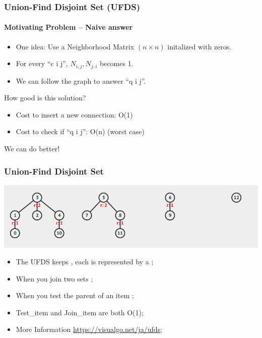 \begin{frame}
  \frametitle{Union-Find Disjoint Set (UFDS)}
  \framesubtitle{Motivating Problem -- Naive answer}

  \begin{itemize}
  \item One idea: Use a Neighborhood Matrix $(n\times n)$ initalized with zeros.
  \item For every ``c i j'', $N_{i,j}, N_{j,i}$ becomes 1.
  \item We can follow the graph to answer ``q i j''.
  \end{itemize}

  \bigskip

  How good is this solution?
  \begin{itemize}
  \item Cost to insert a new connection: O(1)
  \item Cost to check if ``q i j'': O(n) (worst case)
  \end{itemize}

  \bigskip We can do better!
\end{frame}

\begin{frame}
  \frametitle{Union-Find Disjoint Set}

  \begin{center}
    \includegraphics[width=.9\textwidth]{img/ufds1}
  \end{center}

  \begin{itemize}
  \item The UFDS keeps , each is represented by a ;
  \item When you join two sets ;
  \item When you test the parent of an item ;
  \item Test\_item and Join\_item are both O(1);
  \item More Information \url{https://visualgo.net/ja/ufds};
  \end{itemize}
\end{frame}

